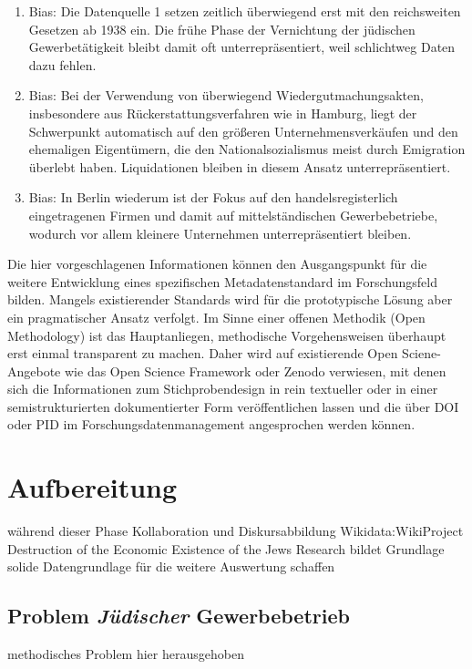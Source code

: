 \begin{enumerate}
    \item Bias: Die Datenquelle 1 setzen zeitlich überwiegend erst mit den reichsweiten Gesetzen ab 1938 ein. Die frühe Phase der Vernichtung der jüdischen Gewerbetätigkeit bleibt damit oft unterrepräsentiert, weil schlichtweg Daten dazu fehlen.
    \item Bias: Bei der Verwendung von überwiegend Wiedergutmachungsakten, insbesondere aus Rückerstattungsverfahren wie in Hamburg, liegt der Schwerpunkt automatisch auf den größeren Unternehmensverkäufen und den ehemaligen Eigentümern, die den Nationalsozialismus meist durch Emigration überlebt haben. Liquidationen bleiben in diesem Ansatz unterrepräsentiert. 
    \item Bias: In Berlin wiederum ist der Fokus auf den handelsregisterlich eingetragenen Firmen und damit auf mittelständischen Gewerbebetriebe, wodurch vor allem kleinere Unternehmen unterrepräsentiert bleiben.  
\end{enumerate}

Die hier vorgeschlagenen Informationen können den Ausgangspunkt für die weitere Entwicklung eines spezifischen Metadatenstandard im Forschungsfeld bilden. Mangels existierender Standards wird für die prototypische Lösung aber ein pragmatischer Ansatz verfolgt. Im Sinne einer offenen Methodik (Open Methodology) ist das Hauptanliegen, methodische Vorgehensweisen überhaupt erst einmal transparent zu machen. Daher wird auf existierende Open Sciene-Angebote wie das Open Science Framework oder Zenodo verwiesen, mit denen sich die Informationen zum Stichprobendesign in rein textueller oder in einer semistrukturierten dokumentierter Form veröffentlichen lassen und die über DOI oder PID im Forschungsdatenmanagement angesprochen werden können. 





\section{Aufbereitung}
während dieser Phase Kollaboration und Diskursabbildung
Wikidata:WikiProject Destruction of the Economic Existence of the Jews Research bildet Grundlage
solide Datengrundlage für die weitere Auswertung schaffen
\subsection{Problem \textit{Jüdischer} Gewerbebetrieb}
methodisches Problem hier herausgehoben

